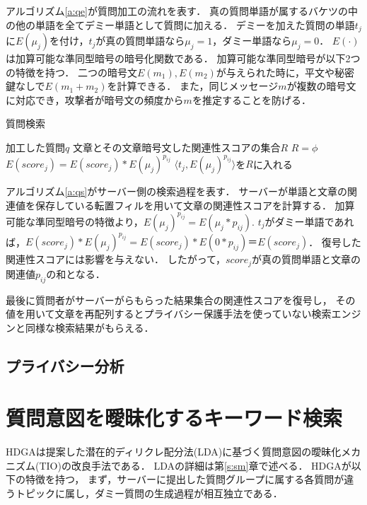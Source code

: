 \documentclass[master]{suribt}
\theoremstyle{definition}
\begin{document}
 アルゴリズム\ref{a:qe}が質問加工の流れを表す．
 真の質問単語が属するバケツの中の他の単語を全てデミー単語として質問に加える．
 デミーを加えた質問の単語$t_j$に$E(\mu_j)$を付け，$t_j$が真の質問単語なら$\mu_j=1$，ダミー単語なら$\mu_j=0$．
 $E(\cdot)$は加算可能な準同型暗号\cite{benaloh_dense_1994}の暗号化関数である．
 加算可能な準同型暗号が以下2つの特徴を持つ．
 二つの暗号文$E(m_1), E(m_2)$が与えられた時に，平文や秘密鍵なしで$E( m_1 + m_2 )$を計算できる．
 また，同じメッセージ$m$が複数の暗号文に対応でき，攻撃者が暗号文の頻度から$m$を推定することを防げる．

 \begin{algorithm}
 \caption{質問検索}
 \begin{algorithmic}[1]
  \Require 加工した質問$q$
  \Ensure 文章とその文章暗号文した関連性スコアの集合$R$
  \State $R=\phi$
     \State $E(score_j)=E(score_j)*E(\mu_j)^{p_{ij}}$
    \Else
     \State $\langle t_j,E(\mu_j)^{p_{ij}}\rangle$を$R$に入れる
    \EndIf
   \EndFor
  \EndFor
 \EndFunction
 \end{algorithmic}
 \label{a:qs}
 \end{algorithm}

 アルゴリズム\ref{a:qs}がサーバー側の検索過程を表す．
 サーバーが単語と文章の関連値を保存している転置フィルを用いて文章の関連性スコアを計算する．
 加算可能な準同型暗号の特徴より，$E(\mu_j)^{p_{ij}}=E(\mu_j*p_{ij})$.
 $t_j$がダミー単語であれば，$E(score_j)*E(\mu_j)^{p_{ij}}=E(score_j)*E(0*p_{ij})＝E(score_j)$．
 復号した関連性スコアには影響を与えない．
 したがって，$score_j$が真の質問単語と文章の関連値$p_{ij}$の和となる．

 最後に質問者がサーバーがらもらった結果集合の関連性スコアを復号し，
 その値を用いて文章を再配列するとプライバシー保護手法を使っていない検索エンジンと同様な検索結果がもらえる．

 \subsection{プライバシー分析}
 
 \section{質問意図を曖昧化するキーワード検索}

 HDGAは\cite{}提案した潜在的ディリクレ配分法(LDA)に基づく質問意図の曖昧化メカニズム(TIO)の改良手法である．
 LDAの詳細は第\ref{s:sm}章で述べる．
 HDGAが以下の特徴を持つ，
 まず，サーバーに提出した質問グループに属する各質問が違うトピックに属し，ダミー質問の生成過程が相互独立である．
\end{document}
